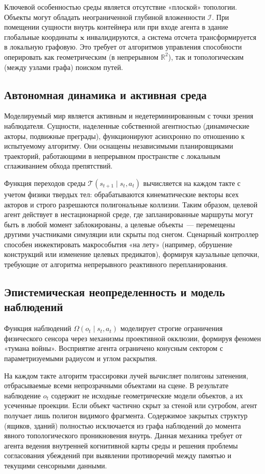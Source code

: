 \documentclass[11pt,a4paper]{article}
\begin{document}
Ключевой особенностью среды является отсутствие «плоской» топологии. Объекты могут обладать неограниченной глубиной вложенности $\mathcal{I}$. При помещении сущности внутрь контейнера или при входе агента в здание глобальные координаты $\mathbf{x}$ инвалидируются, а система отсчета трансформируется в локальную графовую. Это требует от алгоритмов управления способности оперировать как геометрическим (в непрерывном $\mathbb{R}^2$), так и топологическим (между узлами графа) поиском путей.

\subsection{Автономная динамика и активная среда}

Моделируемый мир является активным и недетерминированным с точки зрения наблюдателя. Сущности, наделенные собственной агентностью (динамические акторы, подвижные преграды), функционируют асинхронно по отношению к испытуемому алгоритму. Они оснащены независимыми планировщиками траекторий, работающими в непрерывном пространстве с локальным сглаживанием обхода препятствий. 

Функция переходов среды $\mathcal{T}(s_{t+1} \mid s_t, a_t)$ вычисляется на каждом такте с учетом физики твердых тел: обрабатываются кинематические векторы всех акторов и строго разрешаются полигональные коллизии. Таким образом, целевой агент действует в нестационарной среде, где запланированные маршруты могут быть в любой момент заблокированы, а целевые объекты~--- перемещены другими участниками симуляции или скрыты под снегом. Сценарный контроллер способен инжектировать макрособытия «на лету» (например, обрушение конструкций или изменение целевых предикатов), формируя каузальные цепочки, требующие от алгоритма непрерывного реактивного перепланирования.

\subsection{Эпистемическая неопределенность и модель наблюдений}

Функция наблюдений $\Omega(o_t \mid s_t, a_t)$ моделирует строгие ограничения физического сенсора через механизмы проективной окклюзии, формируя феномен «тумана войны». Восприятие агента ограничено конусным сектором с параметризуемыми радиусом и углом раскрытия.

На каждом такте алгоритм трассировки лучей вычисляет полигоны затенения, отбрасываемые всеми непрозрачными объектами на сцене. В результате наблюдение $o_t$ содержит не исходные геометрические модели объектов, а их усеченные проекции. Если объект частично скрыт за стеной или сугробом, агент получает лишь полигон видимого фрагмента. Содержимое закрытых структур (ящиков, зданий) полностью исключается из графа наблюдений до момента явного топологического проникновения внутрь. Данная механика требует от агента ведения внутренней когнитивной карты среды и решения проблемы согласования убеждений при выявлении противоречий между памятью и текущими сенсорными данными.
\end{document}
